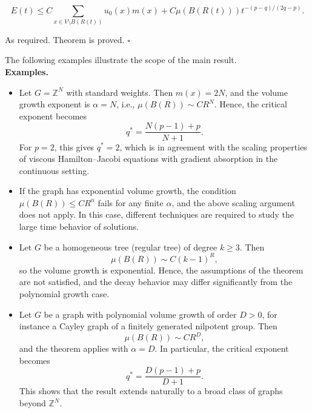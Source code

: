 \documentclass{article}
\begin{document}
	\[
	E(t)\leq C\sum_{x\in V\setminus B(R(t))}u_{0}(x)m(x)+C\mu(B(R(t)))t^{-(p-q)/(2q-p)}.
	\]
	
	As required. Theorem is proved. $\square $
	
	\bigskip
	
	
	The following examples illustrate the scope of the main result. \\
	\noindent\textbf{Examples.}
	
	\begin{itemize}
		
		\item Let $G=\mathbb{Z}^{N}$ with standard weights. Then $m(x)=2N$, and the volume growth exponent is $\alpha = N$, i.e., $\mu(B(R)) \sim C R^{N}$. Hence, the critical exponent becomes
		\[
		q^{*}=\frac{N(p-1)+p}{N+1}.
		\]
		For $p=2$, this gives $q^{*}=2$, which is in agreement with the scaling properties of viscous Hamilton--Jacobi equations with gradient absorption in the continuous setting.
		
		\item If the graph has exponential volume growth, the condition $\mu(B(R))\leq CR^{\alpha}$ fails for any finite $\alpha$, and the above scaling argument does not apply. In this case, different techniques are required to study the large time behavior of solutions.
		
		\item Let $G$ be a homogeneous tree (regular tree) of degree $k\geq 3$. Then
		\[
		\mu(B(R))\sim C(k-1)^{R},
		\]
		so the volume growth is exponential. Hence, the assumptions of the theorem are not satisfied, and the decay behavior may differ significantly from the polynomial growth case.
		
		\item Let $G$ be a graph with polynomial volume growth of order $D>0$, for instance a Cayley graph of a finitely generated nilpotent group. Then
		\[
		\mu(B(R))\sim CR^{D},
		\]
		and the theorem applies with $\alpha=D$. In particular, the critical exponent becomes
		\[
		q^{*}=\frac{D(p-1)+p}{D+1}.
		\]
		This shows that the result extends naturally to a broad class of graphs beyond $\mathbb{Z}^{N}$.
		
	\end{itemize}
	
\end{document}
